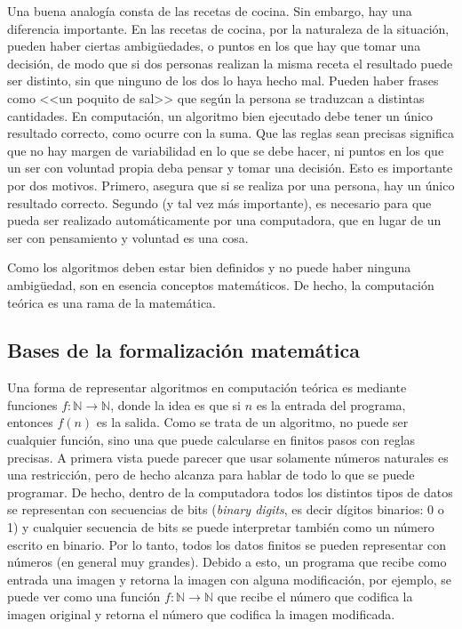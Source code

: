 \documentclass[a4paper, 12pt]{report}
\newcommand{\N}{\mathbb{N}}
\theoremstyle{definition}
\begin{document}
Una buena analogía consta de las recetas de cocina. Sin embargo, hay una diferencia importante. En las recetas de cocina, por la naturaleza de la situación, pueden haber ciertas ambigüedades, o puntos en los que hay que tomar una decisión, de modo que si dos personas realizan la misma receta el resultado puede ser distinto, sin que ninguno de los dos lo haya hecho mal. Pueden haber frases como <<un poquito de sal>> que según la persona se traduzcan a distintas cantidades. En computación, un algoritmo bien ejecutado debe tener un único resultado correcto, como ocurre con la suma. Que las reglas sean precisas significa que no hay margen de variabilidad en lo que se debe hacer, ni puntos en los que un ser con voluntad propia deba pensar y tomar una decisión. Esto es importante por dos motivos. Primero, asegura que si se realiza por una persona, hay un único resultado correcto. Segundo (y tal vez más importante), es necesario para que pueda ser realizado automáticamente por una computadora, que en lugar de un ser con pensamiento y voluntad es una cosa.

Como los algoritmos deben estar bien definidos y no puede haber ninguna ambigüedad, son en esencia conceptos matemáticos. De hecho, la computación teórica es una rama de la matemática.
\subsection{Bases de la formalización matemática}

Una forma de representar algoritmos en computación teórica es mediante funciones $f:\N\to\N$, donde la idea es que si $n$ es la entrada del programa, entonces $f(n)$ es la salida. Como se trata de un algoritmo, no puede ser cualquier función, sino una que puede calcularse en finitos pasos con reglas precisas. A primera vista puede parecer que usar solamente números naturales es una restricción, pero de hecho alcanza para hablar de todo lo que se puede programar. De hecho, dentro de la computadora todos los distintos tipos de datos  se representan con secuencias de bits (\emph{binary digits}, es decir dígitos binarios: 0 o 1) y cualquier secuencia de bits se puede interpretar también como un número escrito en binario. Por lo tanto, todos los datos finitos se pueden representar con números (en general muy grandes). Debido a esto, un programa que recibe como entrada una imagen y retorna la imagen con alguna modificación, por ejemplo, se puede ver como una función $f:\N\to\N$ que recibe el número que codifica la imagen original y retorna el número que codifica la imagen modificada.
\end{document}
